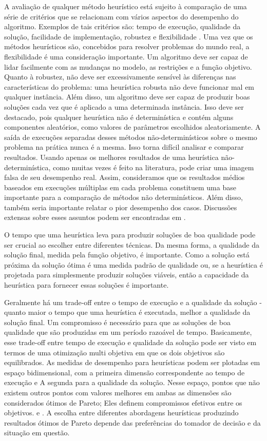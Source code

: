 A avaliação de qualquer método heurístico está sujeito à comparação de uma série de critérios que se relacionam com vários aspectos do desempenho do algoritmo. Exemplos de tais critérios são: tempo de execução, qualidade da solução, facilidade de implementação, robustez e flexibilidade \cite{cordeau12}. Uma vez que os métodos heurísticos são, concebidos para resolver problemas do mundo real, a flexibilidade é uma consideração importante. Um algoritmo deve ser capaz de lidar facilmente com as mudanças no modelo, as restrições e a função objetivo. Quanto à robustez, não deve ser excessivamente sensível às diferenças nas características do problema: uma heurística robusta não deve funcionar mal em qualquer instância. Além disso, um algoritmo deve ser capaz de produzir boas soluções cada vez que é aplicado a uma determinada instância. Isso deve ser destacado, pois qualquer heurística não é determinística e contém alguns componentes aleatórios, como valores de parâmetros escolhidos aleatoriamente. A saída de execuções separadas desses métodos não-determinísticos sobre o mesmo problema na prática nunca é a mesma. Isso torna difícil analisar e comparar resultados. Usando apenas os melhores resultados de uma heurística não-determinística, como muitas vezes é feito na literatura, pode criar uma imagem falsa de seu desempenho real. Assim, consideramos que os resultados médios baseados em execuções múltiplas em cada problema constituem uma base importante para a comparação de métodos não determinísticos. Além disso, também seria importante relatar o pior desempenho dos casos. Discussões extensas sobre esses assuntos podem ser encontradas em \cite{cordeau12}.



O tempo que uma heurística leva para produzir soluções de boa qualidade pode ser crucial ao escolher entre diferentes técnicas. Da mesma forma, a qualidade da solução final, medida pela função objetivo, é importante. Como a solução está próxima da solução ótima é uma medida padrão de qualidade ou, se a heurística é projetada para simplesmente produzir soluções viáveis, então a capacidade da heurística para fornecer essas soluções é importante.


Geralmente há um trade-off entre o tempo de execução e a qualidade da solução - quanto maior o tempo que uma heurística é executada, melhor a qualidade da solução final. Um compromisso é necessário para que as soluções de boa qualidade que são produzidas em um período razoável de tempo. Basicamente, esse trade-off entre tempo de execução e qualidade da solução pode ser visto em termos de uma otimização multi objetiva em que os dois objetivos são equilibrados. As medidas de desempenho para heurísticas podem ser plotadas em espaço bidimensional, com a primeira dimensão correspondente ao tempo de execução e A segunda para a qualidade da solução. Nesse espaço, pontos que não existem outros pontos com valores melhores em ambas as dimensões são considerados ótimos de Pareto; Eles definem compromissos efetivos entre os objetivos. \cite{russell94} e \cite{braysy05} . A escolha entre diferentes abordagens heurísticas produzindo resultados ótimos de Pareto depende das preferências do tomador de decisão e da situação em questão.


